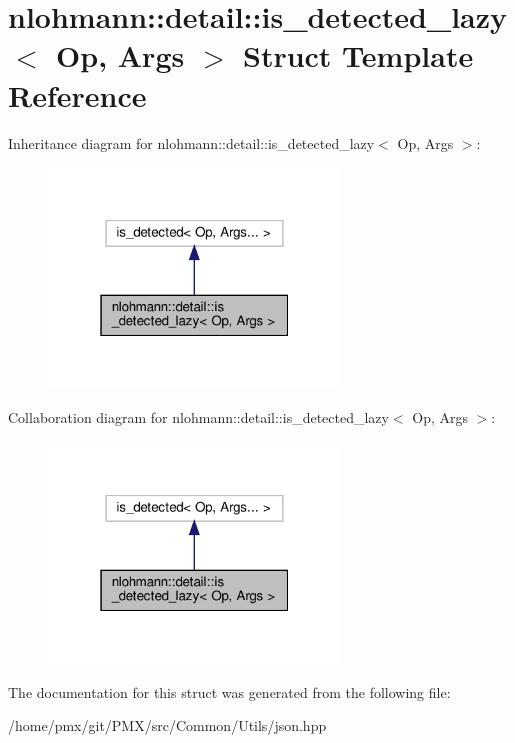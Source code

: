 \hypertarget{structnlohmann_1_1detail_1_1is__detected__lazy}{}\section{nlohmann\+:\+:detail\+:\+:is\+\_\+detected\+\_\+lazy$<$ Op, Args $>$ Struct Template Reference}
\label{structnlohmann_1_1detail_1_1is__detected__lazy}


Inheritance diagram for nlohmann\+:\+:detail\+:\+:is\+\_\+detected\+\_\+lazy$<$ Op, Args $>$\+:
\nopagebreak
\begin{figure}[H]
\begin{center}
\leavevmode
\includegraphics[width=220pt]{structnlohmann_1_1detail_1_1is__detected__lazy__inherit__graph}
\end{center}
\end{figure}


Collaboration diagram for nlohmann\+:\+:detail\+:\+:is\+\_\+detected\+\_\+lazy$<$ Op, Args $>$\+:
\nopagebreak
\begin{figure}[H]
\begin{center}
\leavevmode
\includegraphics[width=220pt]{structnlohmann_1_1detail_1_1is__detected__lazy__coll__graph}
\end{center}
\end{figure}


The documentation for this struct was generated from the following file\+:\begin{DoxyCompactItemize}
\item 
/home/pmx/git/\+P\+M\+X/src/\+Common/\+Utils/json.\+hpp\end{DoxyCompactItemize}
